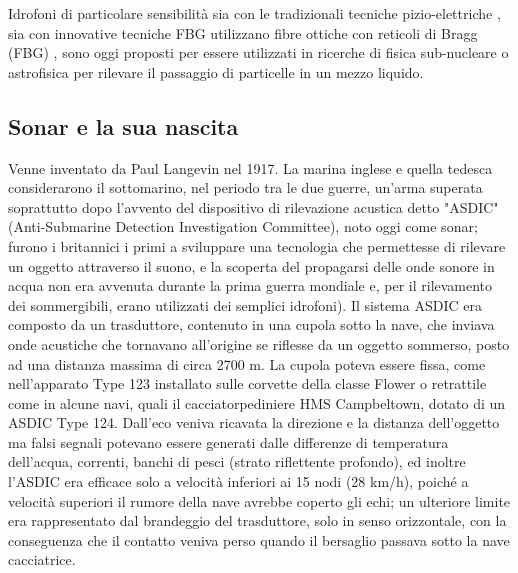 Idrofoni di particolare sensibilità sia con le tradizionali tecniche pizio-elettriche , sia con innovative tecniche FBG utilizzano fibre ottiche con reticoli di Bragg (FBG) , sono oggi proposti per essere utilizzati in ricerche di fisica sub-nucleare o astrofisica per rilevare il passaggio di particelle in un mezzo liquido.
\begin{code}
\end{code}
\subsection {Sonar e la sua nascita}
Venne inventato da Paul Langevin nel 1917. La marina inglese e quella tedesca considerarono il sottomarino, nel periodo tra le due guerre, un'arma superata soprattutto dopo l'avvento del dispositivo di rilevazione acustica detto "ASDIC" (Anti-Submarine Detection Investigation Committee), noto oggi come sonar; furono i britannici i primi a sviluppare una tecnologia che permettesse di rilevare un oggetto attraverso il suono, e la scoperta del propagarsi delle onde sonore in acqua non era avvenuta durante la prima guerra mondiale e, per il rilevamento dei sommergibili, erano utilizzati dei semplici idrofoni). Il sistema ASDIC era composto da un trasduttore, contenuto in una cupola sotto la nave, che inviava onde acustiche che tornavano all'origine se riflesse da un oggetto sommerso, posto ad una distanza massima di circa 
2700 m. La cupola poteva essere fissa, come nell'apparato Type 123 installato sulle corvette della classe Flower o retrattile come in alcune navi, quali il cacciatorpediniere HMS Campbeltown, dotato di un ASDIC Type 124. Dall'eco veniva ricavata la direzione e la distanza dell'oggetto ma falsi segnali potevano essere generati dalle differenze di temperatura dell'acqua, correnti, banchi di pesci (strato riflettente profondo), ed inoltre l'ASDIC era efficace solo a velocità inferiori ai 15 nodi (28 km/h), poiché a velocità superiori il rumore della nave avrebbe coperto gli echi; un ulteriore limite era rappresentato dal brandeggio del trasduttore, solo in senso orizzontale, con la conseguenza che il contatto veniva perso quando il bersaglio passava sotto la nave cacciatrice.

